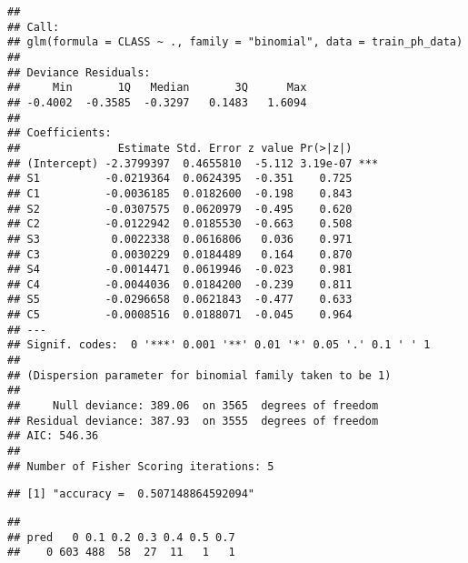 \documentclass[]{article}
\newenvironment{Shaded}{\begin{snugshade}}{\end{snugshade}}
\newcommand{\KeywordTok}[1]{\textcolor[rgb]{0.13,0.29,0.53}{\textbf{#1}}}
\newcommand{\DataTypeTok}[1]{\textcolor[rgb]{0.13,0.29,0.53}{#1}}
\newcommand{\DecValTok}[1]{\textcolor[rgb]{0.00,0.00,0.81}{#1}}
\newcommand{\FloatTok}[1]{\textcolor[rgb]{0.00,0.00,0.81}{#1}}
\newcommand{\StringTok}[1]{\textcolor[rgb]{0.31,0.60,0.02}{#1}}
\newcommand{\OperatorTok}[1]{\textcolor[rgb]{0.81,0.36,0.00}{\textbf{#1}}}
\newcommand{\NormalTok}[1]{#1}
\begin{document}
\begin{verbatim}
## 
## Call:
## glm(formula = CLASS ~ ., family = "binomial", data = train_ph_data)
## 
## Deviance Residuals: 
##     Min       1Q   Median       3Q      Max  
## -0.4002  -0.3585  -0.3297   0.1483   1.6094  
## 
## Coefficients:
##               Estimate Std. Error z value Pr(>|z|)    
## (Intercept) -2.3799397  0.4655810  -5.112 3.19e-07 ***
## S1          -0.0219364  0.0624395  -0.351    0.725    
## C1          -0.0036185  0.0182600  -0.198    0.843    
## S2          -0.0307575  0.0620979  -0.495    0.620    
## C2          -0.0122942  0.0185530  -0.663    0.508    
## S3           0.0022338  0.0616806   0.036    0.971    
## C3           0.0030229  0.0184489   0.164    0.870    
## S4          -0.0014471  0.0619946  -0.023    0.981    
## C4          -0.0044036  0.0184200  -0.239    0.811    
## S5          -0.0296658  0.0621843  -0.477    0.633    
## C5          -0.0008516  0.0188071  -0.045    0.964    
## ---
## Signif. codes:  0 '***' 0.001 '**' 0.01 '*' 0.05 '.' 0.1 ' ' 1
## 
## (Dispersion parameter for binomial family taken to be 1)
## 
##     Null deviance: 389.06  on 3565  degrees of freedom
## Residual deviance: 387.93  on 3555  degrees of freedom
## AIC: 546.36
## 
## Number of Fisher Scoring iterations: 5
\end{verbatim}

\begin{Shaded}
\end{Shaded}

\begin{verbatim}
## [1] "accuracy =  0.507148864592094"
\end{verbatim}

\begin{Shaded}
\end{Shaded}

\begin{verbatim}
##     
## pred   0 0.1 0.2 0.3 0.4 0.5 0.7
##    0 603 488  58  27  11   1   1
\end{verbatim}
\end{document}
